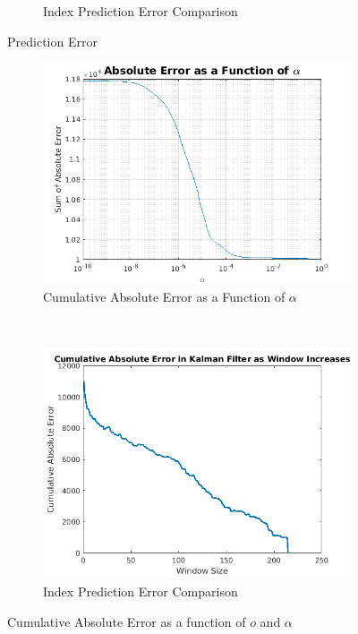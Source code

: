 \documentclass[11pt, fleqn]{article}
\begin{document}
\begin{figure}[!h]
\begin{subfigure}[b]{0.42\textwidth}
		\caption{Index Prediction Error Comparison}
		\label{fig:kalman-autoreg-error-boxplot}
    \end{subfigure}
    \caption{Prediction Error}
	\label{fig:prediction-error}
\end{figure}

\begin{figure}[!h]
    \centering
    \begin{subfigure}[b]{0.45\textwidth}
        \includegraphics[width=\textwidth]{error-vs-alpha-order-3.png}
	\caption{Cumulative Absolute Error as a Function of $\alpha$}
	\label{fig:error-vs-alpha-order-3}
    \end{subfigure}
    ~ 
    \begin{subfigure}[b]{0.42\textwidth}
        \includegraphics[width=\textwidth]{kalman-error-vs-window.png}
		\caption{Index Prediction Error Comparison}
		\label{fig:kalman-error-vs-window}
    \end{subfigure}
    \caption{Cumulative Absolute Error as a function of $o$ and $\alpha$}
	\label{fig:o-alpha-error}
\end{figure}
\end{document}
